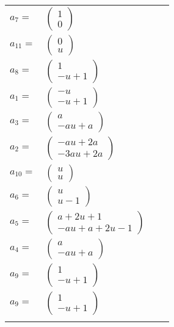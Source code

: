 \documentclass[1p]{elsarticle_modified}
\theoremstyle{definition}
\begin{document}
\begin{tabular}{m{7pt} m{180pt} m{7pt} m{180pt} }
\flushright $a_{7}=$&$\begin{pmatrix}1\\0\end{pmatrix}$ \\
\flushright $a_{11}=$&$\begin{pmatrix}0\\u\end{pmatrix}$ \\
\flushright $a_{8}=$&$\begin{pmatrix}1\\- u+1\end{pmatrix}$ \\
\flushright $a_{1}=$&$\begin{pmatrix}- u\\- u+1\end{pmatrix}$ \\
\flushright $a_{3}=$&$\begin{pmatrix}a\\- a u+a\end{pmatrix}$ \\
\flushright $a_{2}=$&$\begin{pmatrix}- a u+2 a\\-3 a u+2 a\end{pmatrix}$ \\
\flushright $a_{10}=$&$\begin{pmatrix}u\\u\end{pmatrix}$ \\
\flushright $a_{6}=$&$\begin{pmatrix}u\\u-1\end{pmatrix}$ \\
\flushright $a_{5}=$&$\begin{pmatrix}a+2 u+1\\- a u+a+2 u-1\end{pmatrix}$ \\
\flushright $a_{4}=$&$\begin{pmatrix}a\\- a u+a\end{pmatrix}$ \\
\flushright $a_{9}=$&$\begin{pmatrix}1\\- u+1\end{pmatrix}$\\ \flushright $a_{9}=$&$\begin{pmatrix}1\\- u+1\end{pmatrix}$\\&\end{tabular}
\end{document}
